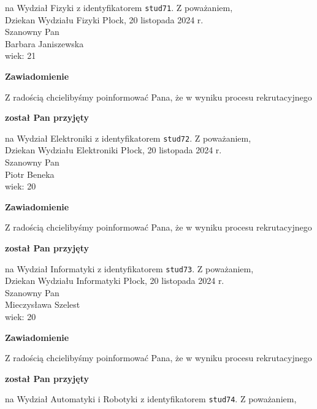 \documentclass[12pt,a4paper]{article}
\begin{document}
na Wydział Fizyki z identyfikatorem \verb|stud71|. 
\vspace{2cm}
\noindent
Z poważaniem,\\
Dziekan
Wydziału Fizyki
\newpage
\hfill Płock, 20 listopada 2024 r.\\
\noindent 
Szanowny Pan \\
Barbara Janiszewska \\
wiek: 21
\bigskip
\begin{center}
 	{\Large\textbf{Zawiadomienie}}
\end{center}
\bigskip
Z radością chcielibyśmy poinformować Pana, że w wyniku procesu rekrutacyjnego 
\begin{center}
\textsf{\textbf{został Pan przyjęty}} 
\end{center}
na Wydział Elektroniki z identyfikatorem \verb|stud72|. 
\vspace{2cm}
\noindent
Z poważaniem,\\
Dziekan
Wydziału Elektroniki
\newpage
\hfill Płock, 20 listopada 2024 r.\\
\noindent 
Szanowny Pan \\
Piotr Beneka \\
wiek: 20
\bigskip
\begin{center}
 	{\Large\textbf{Zawiadomienie}}
\end{center}
\bigskip
Z radością chcielibyśmy poinformować Pana, że w wyniku procesu rekrutacyjnego 
\begin{center}
\textsf{\textbf{został Pan przyjęty}} 
\end{center}
na Wydział Informatyki z identyfikatorem \verb|stud73|. 
\vspace{2cm}
\noindent
Z poważaniem,\\
Dziekan
Wydziału Informatyki
\newpage
\hfill Płock, 20 listopada 2024 r.\\
\noindent 
Szanowny Pan \\
Mieczysława Szelest \\
wiek: 20
\bigskip
\begin{center}
 	{\Large\textbf{Zawiadomienie}}
\end{center}
\bigskip
Z radością chcielibyśmy poinformować Pana, że w wyniku procesu rekrutacyjnego 
\begin{center}
\textsf{\textbf{został Pan przyjęty}} 
\end{center}
na Wydział Automatyki i Robotyki z identyfikatorem \verb|stud74|. 
\vspace{2cm}
\noindent
Z poważaniem,\\
\end{document}
